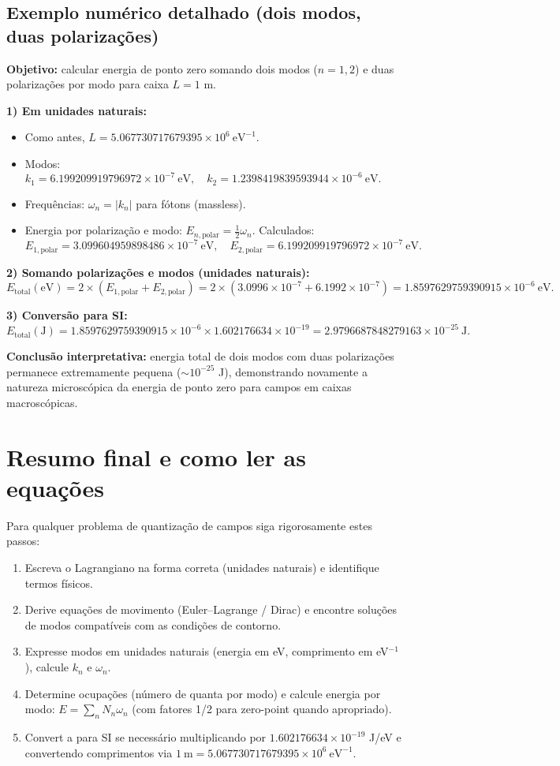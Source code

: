 \documentclass[12pt,a4paper]{article}
\begin{document}
\subsection{Exemplo numérico detalhado (dois modos, duas polarizações)}
\textbf{Objetivo:} calcular energia de ponto zero somando dois modos ($n=1,2$) e duas polarizações por modo para caixa $L=1$ m.

\textbf{1) Em unidades naturais:}
\begin{itemize}
  \item Como antes, $L=5.067730717679395\times10^{6}\ \mathrm{eV^{-1}}$.
  \item Modos: $k_1=6.199209919796972\times10^{-7}\ \mathrm{eV},\quad k_2=1.2398419839593944\times10^{-6}\ \mathrm{eV}.$
  \item Frequências: $\omega_n=|k_n|$ para fótons (massless).
  \item Energia por polarização e modo: $E_{n,\text{polar}}=\tfrac{1}{2}\omega_n$. Calculados:
  \[ E_{1,\text{polar}}=3.099604959898486\times10^{-7}\ \mathrm{eV},\quad E_{2,\text{polar}}=6.199209919796972\times10^{-7}\ \mathrm{eV}. \]
\end{itemize}

\textbf{2) Somando polarizações e modos (unidades naturais):}
\[ E_{\text{total}}(\mathrm{eV}) = 2\times(E_{1,\text{polar}}+E_{2,\text{polar}}) = 2\times(3.0996\times10^{-7}+6.1992\times10^{-7}) = 1.8597629759390915\times10^{-6}\ \mathrm{eV}. \]

\textbf{3) Conversão para SI:}
\[ E_{\text{total}}(\mathrm{J}) = 1.8597629759390915\times10^{-6}\times1.602176634\times10^{-19} = 2.9796687848279163\times10^{-25}\ \mathrm{J}. \]

\textbf{Conclusão interpretativa:} energia total de dois modos com duas polarizações permanece extremamente pequena (\(\sim10^{-25}\) J), demonstrando novamente a natureza microscópica da energia de ponto zero para campos em caixas macroscópicas.

\section*{Resumo final e como ler as equações}
Para qualquer problema de quantização de campos siga rigorosamente estes passos:
\begin{enumerate}
  \item Escreva o Lagrangiano na forma correta (unidades naturais) e identifique termos físicos.
  \item Derive equações de movimento (Euler--Lagrange / Dirac) e encontre soluções de modos compatíveis com as condições de contorno.
  \item Expresse modos em unidades naturais (energia em eV, comprimento em eV$^{-1}$), calcule $k_n$ e $\omega_n$.
  \item Determine ocupações (número de quanta por modo) e calcule energia por modo: $E=\sum_n N_n\omega_n$ (com fatores 1/2 para zero-point quando apropriado).
  \item Convert a para SI se necessário multiplicando por $1.602176634\times10^{-19}$ J/eV e convertendo comprimentos via $1\ \mathrm{m}=5.067730717679395\times10^{6}\ \mathrm{eV^{-1}}$.
\end{enumerate}
\end{document}

